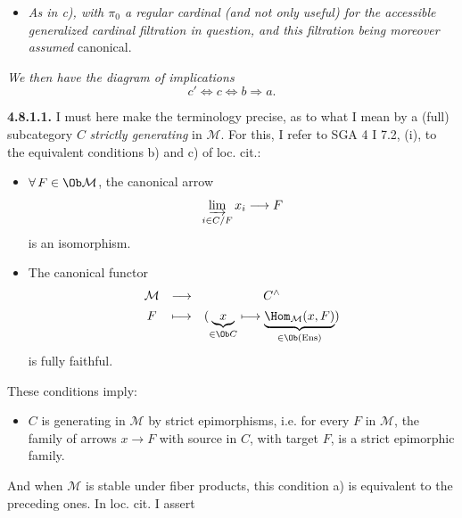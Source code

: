 
\begin{itemize}[label={}]
\item[\textit{c$'$)}] \textit{As in c), with $\pi_0$ a regular cardinal (and not only useful) for the accessible generalized cardinal filtration in question, and this filtration being moreover assumed} canonical.
\end{itemize}
\textit{We then have the diagram of implications}
\[ c' \Longleftrightarrow c \Longleftrightarrow b \Longrightarrow a . \]

\textbf{4.8.1.1.} I must here make the terminology precise, as to what I mean by a (full) subcategory $C$ \textit{strictly generating} in $\mathcal{M}$. For this, I refer to SGA 4 I 7.2, (i), to the equivalent conditions b) and c) of loc. cit.:
\begin{itemize}[label={}]
\item[\circled{b}] $\forall\, F \in \Ob \mathcal{M}$, the canonical arrow
\[ \varinjlim_{i\in C/F} x_i \longrightarrow F \]
is an isomorphism.
\item[\circled{c}] The canonical functor
\[ \begin{array}{ccc}
\mathcal{M} & \longrightarrow & C^{\wedge} \\[1ex]
F & \longmapsto & (\underbrace{x}_{\in \Ob C} \longmapsto \underbrace{\Hom_{\mathcal{M}}(x,F)}_{\in \Ob (\mathrm{Ens})})
\end{array} \]
is fully faithful.
\end{itemize}
These conditions imply:
\begin{itemize}[label={}]
\item[a)] $C$ is generating in $\mathcal{M}$ by strict epimorphisms, i.e. for every $F$ in $\mathcal{M}$, the family of arrows $x \longrightarrow F$ with source in $C$, with target $F$, is a strict epimorphic family.
\end{itemize}
And when $\mathcal{M}$ is stable under fiber products, this condition a) is equivalent to the preceding ones. In loc. cit. I assert


